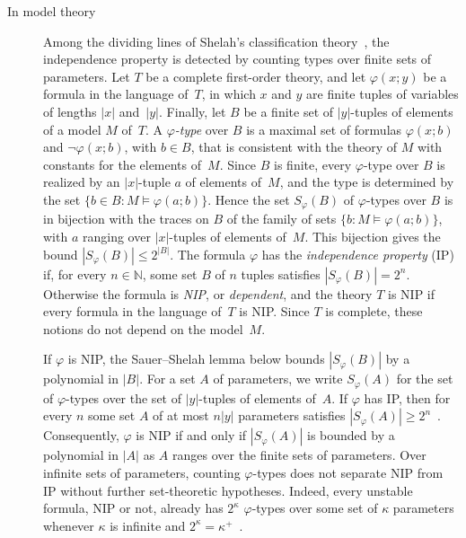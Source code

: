 \documentclass[psamsfonts]{amsart}
\theoremstyle{definition}
\theoremstyle{remark}
\numberwithin{equation}{section}
\begin{document}
\begin{description}

\item[In model theory]
  Among the dividing lines of Shelah’s classification theory~\cite{Shelah:1990}, the independence property is detected by counting types over finite sets of parameters.
  Let $T$ be a complete first-order theory, and let $\varphi(x;y)$ be a formula in the language of~$T$, in which $x$ and $y$ are finite tuples of variables of lengths $|x|$ and~$|y|$.
  Finally, let $B$ be a finite set of $|y|$-tuples of elements of a model $M$ of~$T$.
  A \emph{$\varphi$-type} over $B$ is a maximal set of formulas $\varphi(x;b)$ and $\neg\varphi(x;b)$, with $b\in B$, that is consistent with the theory of $M$ with constants for the elements of~$M$.
  Since $B$ is finite, every $\varphi$-type over $B$ is realized by an $|x|$-tuple $a$ of elements of~$M$, and the type is determined by the set $\{b\in B: M\models\varphi(a;b)\}$.
  Hence the set $S_\varphi(B)$ of $\varphi$-types over $B$ is in bijection with the traces on $B$ of the family of sets $\{b: M\models\varphi(a;b)\}$, with $a$ ranging over $|x|$-tuples of elements of~$M$.
  This bijection gives the bound $|S_\varphi(B)|\le2^{|B|}$.
  The formula $\varphi$ has the \emph{independence property} (IP) if, for every $n\in\mathbb{N}$, some set $B$ of $n$ tuples satisfies $|S_\varphi(B)|=2^n$.
  Otherwise the formula is \emph{NIP}, or \emph{dependent}, and the theory $T$ is NIP if every formula in the language of~$T$ is NIP.
  Since $T$ is complete, these notions do not depend on the model~$M$.

  If $\varphi$ is NIP, the Sauer--Shelah lemma below bounds $|S_\varphi(B)|$ by a polynomial in $|B|$.
  For a set $A$ of parameters, we write $S_\varphi(A)$ for the set of $\varphi$-types over the set of $|y|$-tuples of elements of~$A$.
  If $\varphi$ has IP, then for every $n$ some set $A$ of at most $n|y|$ parameters satisfies $|S_\varphi(A)|\ge2^n$~\cite[Section~2.3.4]{simon2015nip}.
  Consequently, $\varphi$ is NIP if and only if $|S_\varphi(A)|$ is bounded by a polynomial in $|A|$ as $A$ ranges over the finite sets of parameters.
  Over infinite sets of parameters, counting $\varphi$-types does not separate NIP from IP without further set-theoretic hypotheses.
  Indeed, every unstable formula, NIP or not, already has $2^\kappa$ $\varphi$-types over some set of $\kappa$ parameters whenever $\kappa$ is infinite and $2^\kappa=\kappa^+$~\cite[Section~2.3.4]{simon2015nip}.


\end{description}
\end{document}
